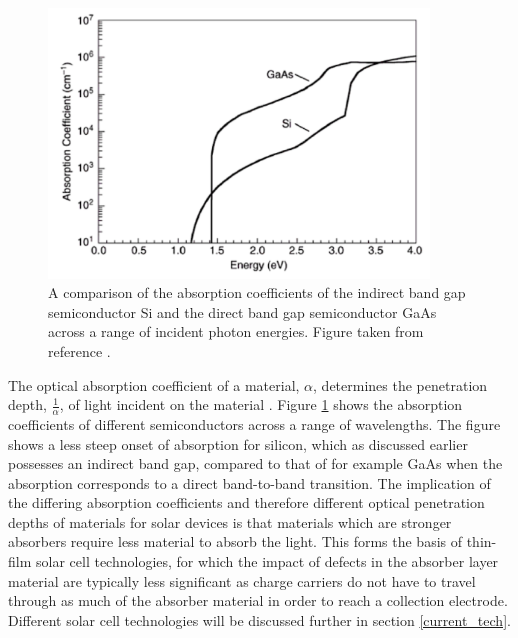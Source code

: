 \begin{figure}[h!]
  \centering
    \includegraphics[width=0.9\textwidth]{figures/absorption_fig2.png}
    \caption{A comparison of the absorption coefficients of the indirect band gap semiconductor Si and the direct band gap semiconductor GaAs across a range of incident photon energies. Figure taken from reference .}
  \label{absorption_fig2}
\end{figure}

The optical absorption coefficient of a material, $\alpha$, determines the penetration depth, $\frac{1}{\alpha}$, of light incident on the material \cite{absorption_coeff_book1}. Figure \ref{absorption_fig2} shows the absorption coefficients of different semiconductors across a range of wavelengths. The figure shows a less steep onset of absorption for silicon, which as discussed earlier possesses an indirect band gap, compared to that of for example GaAs when the absorption corresponds to a direct band-to-band transition. The implication of the differing absorption coefficients and therefore different optical penetration depths of materials for solar devices is that materials which are stronger absorbers require less material to absorb the light. This forms the basis of thin-film solar cell technologies, for which the impact of defects in the absorber layer material are typically less significant as charge carriers do not have to travel through as much of the absorber material in order to reach a collection electrode. Different solar cell technologies will be discussed further in section \ref{current_tech}.

